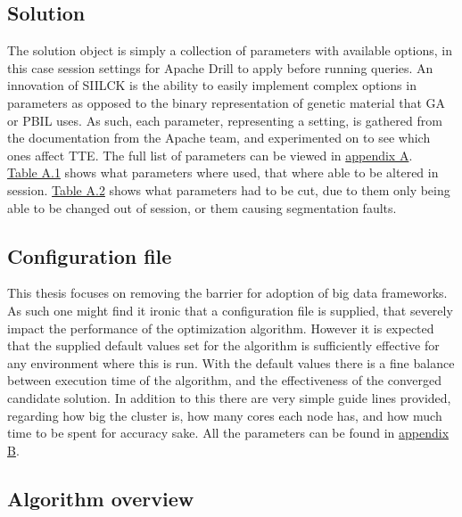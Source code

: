 \documentclass[a4paper,english]{report}
\begin{document}
		\subsection{Solution}
		The solution object is simply a collection of parameters with available options, in this case session settings for Apache Drill to apply before running queries. An innovation of SIILCK is the ability to easily implement complex options in parameters as opposed to the binary representation of genetic material that GA or PBIL uses. As such, each parameter, representing a setting, is gathered from the documentation from the Apache team, and experimented on to see which ones affect TTE. The full list of parameters can be viewed in \hyperref[system_params]{appendix A}. \\ \hyperref[table:added_params]{Table A.1} shows what parameters where used, that where able to be altered in session. \hyperref[table:removed_params]{Table A.2} shows what parameters had to be cut, due to them only being able to be changed out of session, or them causing segmentation faults. 
		\subsection{Configuration file}
			This thesis focuses on removing the barrier for adoption of big data frameworks. As such one might find it ironic that a configuration file is supplied, that severely impact the performance of the optimization algorithm. However it is expected that the supplied default values set for the algorithm is sufficiently effective for any environment where this is run. With the default values there is a fine balance between execution time of the algorithm, and the effectiveness of the converged candidate solution. In addition to this there are very simple guide lines provided, regarding how big the cluster is, how many cores each node has, and how much time to be spent for accuracy sake. All the parameters can be found in \hyperref[table:conf_params]{appendix B}.
			\clearpage
		\subsection{Algorithm overview}
\end{document}
